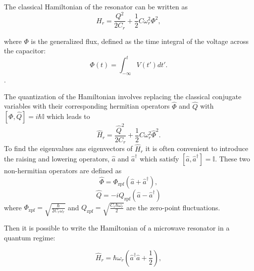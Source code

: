 The classical Hamiltonian of the resonator can be written as 
\begin{equation}\label{eq:classical_hamiltonian_resonator}
    H_r = \frac{Q^2}{2C_r} +  \frac{1}{2}C\omega_r^2\Phi^2,
\end{equation}

where $\Phi$ is the generalized flux, defined as the time integral of the voltage across the capacitor:
\begin{equation}\label{eq:generalized_flux}
    \Phi(t) = \int_{-\infty}^{t} V(t')dt' .
\end{equation}.

The quantization of the Hamiltonian involves replacing the classical conjugate variables with their corresponding hermitian operators $\hat{\Phi}$ and $\hat{Q}$ with $[\hat{\Phi},\hat{Q}]=i\hbar\mathbb{I}$ which leads to
\begin{equation}
    \hat{H}_r = \frac{\hat{Q}^2}{2C_r} +  \frac{1}{2}C\omega_r^2\hat{\Phi}^2.
\end{equation}
To find the eigenvalues ans eigenvectors of $\hat{H}_r$ it is often convenient to introduce the raising and lowering operators, $\hat{a}$ and $\hat{a}^\dagger$ which satisfy $[\hat{a},\hat{a}^\dagger]=\mathbb{I}$.
These two non-hermitian operators are defined as 
\begin{equation}\label{eq:Phi_operator}
    \hat{\Phi} =  \Phi_{\text{zpf}}(\hat{a} + \hat{a}^\dagger),
\end{equation}
\begin{equation}\label{eq:Q_operator}
    \hat{Q} = -iQ_{\text{zpf}}(\hat{a} - \hat{a}^\dagger)
\end{equation}
where $\Phi_{\text{zpf}} = \sqrt{\frac{\hbar}{2C_r\omega_r}}$ and $Q_{\text{zpf}} = \sqrt{\frac{C_r\hbar \omega_r}{2}}$ are the zero-point fluctuations.

Then it is possible to write the Hamiltonian of a microwave resonator in a quantum regime:

\begin{equation}\label{eq:quant_resonator_hamiltonian}
    \hat{H}_r = \hbar\omega_r\left(\hat{a}^\dagger\hat{a} + \frac{1}{2}\right),
\end{equation}

